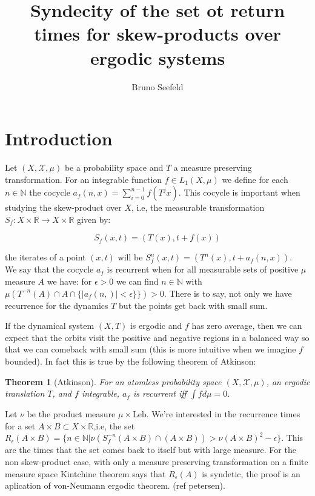 \documentclass{article}
\title{Syndecity of the set ot return times for skew-products over
ergodic systems}
\author{Bruno Seefeld}
\newtheorem{theorem}{Theorem}[section]
\begin{document}
\maketitle


\begin{abstract}

\end{abstract}


\section{Introduction}

Let $(X,\mathcal{X},\mu)$ be a probability space and $T$ a measure preserving
transformation.
For an integrable function $f\in L_1(X,\mu)$ we define for each $n\in
\mathbb{N}$ the cocycle $a_f(n,x)=\sum_{i=0}^{n-1}f(T^j x)$.
This cocycle is important when studying the skew-product over $X$,
i.e, the measurable transformation $S_f:X\times\mathbb{R}\to X\times\mathbb{R}$
given by:

\begin{equation}
S_f(x,t)=(T(x),t+f(x))
\end{equation}


the iterates of a point $(x,t)$ will be $S_f^n(x,t)=(T^n(x),t+a_f(n,x))$.
\\

We say that the cocycle $a_f$ is recurrent when for all measurable
sets of positive $\mu$ measure $A$ we have: for $\epsilon>0$ we can
find $n\in\mathbb{N}$ with $\mu(T^{-n}(A)\cap A\cap \{|a_f(n,)|<\epsilon\}\})>0$.
There is to say, not only we have recurrence for the dynamics $T$ but
the points get back with small sum. 

If the dynamical system $(X,T)$ is ergodic and $f$ has zero average,
then we can expect that the orbits visit the positive and negative 
regions in a balanced way so that we can comeback with small sum (this is
more intuitive when we imagine $f$ bounded). In fact this is true by
the following theorem of Atkinson:


\begin{theorem}[Atkinson] \label{theorem:Atkinson}
    For an atomless probability space $(X,\mathcal{X},\mu)$, an ergodic translation $T$,
    and $f$ integrable, $a_f$ is recurrent iff $\int f d\mu=0$.
\end{theorem}


Let $\nu$ be the product measure $\mu\times \text{Leb}$. We're interested in the recurrence times for a set $A\times B\subset 
X\times \mathbb{R}$,i.e, the set $R_\epsilon (A\times B)=\{n\in\mathbb{N}|
\nu(S_f^{-n}(A\times B)\cap(A\times B))>\nu (A\times B)^2-\epsilon\}$.  This
are the times that the set comes back to itself but with large  measure.
For the non skew-product case, with only a measure preserving transformation
on a finite measure space Kintchine theorem says that $R_\epsilon(A)$
is syndetic, the proof is an aplication of von-Neumann ergodic theorem.
(ref petersen).
\\
\end{document}
